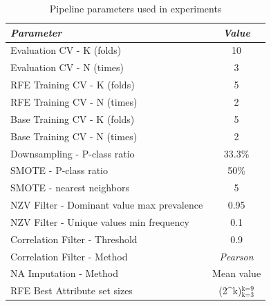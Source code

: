 \begin{table}[h]
    \caption{Pipeline parameters used in experiments}
    \begin{center}
        \begin{tabular}{l|c}
            \textit{Parameter}                             & \textit{Value}                                   \\
            \hline
            \hline
            Evaluation CV - K (folds)                      & 10                                               \\
            Evaluation CV - N (times)                      & 3                                                \\
            RFE Training CV - K (folds)                    & 5                                                \\
            RFE Training CV - N (times)                    & 2                                                \\
            Base Training CV - K (folds)                   & 5                                                \\
            Base Training CV - N (times)                   & 2                                                \\
            Downsampling - P-class ratio                   & 33.3\%                                           \\
            SMOTE - P-class ratio                          & 50\%                                             \\
            SMOTE - nearest neighbors                      & 5                                                \\
            NZV Filter - Dominant value max prevalence     & 0.95                                             \\
            NZV Filter - Unique values min frequency       & 0.1                                              \\
            Correlation Filter - Threshold                 & 0.9                                              \\
            Correlation Filter - Method                    & \textit{Pearson}                                 \\
            NA Imputation - Method                         & Mean value                                       \\
            RFE Best Attribute set sizes                   & (2^k)$^{\text{k=9}}_{\text{k=3}}$                \\

\end{tabular}
\end{center}
\end{table}
